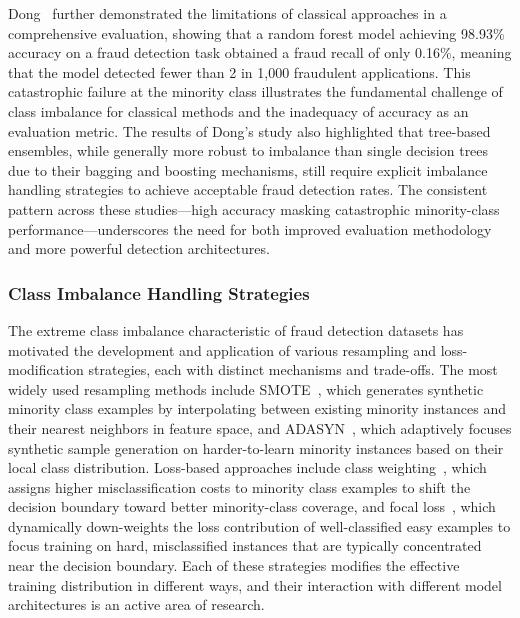 Dong~\cite{dong2025enhanced} further demonstrated the limitations of classical
approaches in a comprehensive evaluation, showing that a random forest model
achieving 98.93\% accuracy on a fraud detection task obtained a fraud recall of
only 0.16\%, meaning that the model detected fewer than 2 in 1,000 fraudulent
applications. This catastrophic failure at the minority class illustrates the
fundamental challenge of class imbalance for classical methods and the
inadequacy of accuracy as an evaluation metric. The results of Dong's study also
highlighted that tree-based ensembles, while generally more robust to imbalance
than single decision trees due to their bagging and boosting mechanisms, still
require explicit imbalance handling strategies to achieve acceptable fraud
detection rates. The consistent pattern across these studies---high accuracy
masking catastrophic minority-class performance---underscores the need for both
improved evaluation methodology and more powerful detection architectures.

\subsubsection{Class Imbalance Handling Strategies}

The extreme class imbalance characteristic of fraud detection datasets has
motivated the development and application of various resampling and loss-
modification strategies, each with distinct mechanisms and trade-offs. The most
widely used resampling methods include SMOTE~\cite{chawla2002smote}, which
generates synthetic minority class examples by interpolating between existing
minority instances and their nearest neighbors in feature space, and
ADASYN~\cite{he2008adasyn}, which adaptively focuses synthetic sample generation
on harder-to-learn minority instances based on their local class distribution.
Loss-based approaches include class weighting~\cite{byrd2019effect}, which
assigns higher misclassification costs to minority class examples to shift the
decision boundary toward better minority-class coverage, and focal
loss~\cite{lin2017focal}, which dynamically down-weights the loss contribution
of well-classified easy examples to focus training on hard, misclassified
instances that are typically concentrated near the decision boundary. Each of
these strategies modifies the effective training distribution in different ways,
and their interaction with different model architectures is an active area of
research.

